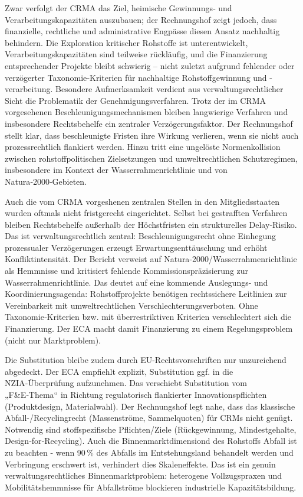 \documentclass[12pt,a4paper,oneside]{book} %
\begin{document}
Zwar verfolgt der CRMA das Ziel, heimische Gewinnungs‑ und Verarbeitungskapazitäten auszubauen; der Rechnungshof zeigt jedoch, dass finanzielle, rechtliche und administrative Engpässe diesen Ansatz nachhaltig behindern. Die Exploration kritischer Rohstoffe ist unterentwickelt, Verarbeitungskapazitäten sind teilweise rückläufig, und die Finanzierung entsprechender Projekte bleibt schwierig – nicht zuletzt aufgrund fehlender oder verzögerter Taxonomie‑Kriterien für nachhaltige Rohstoffgewinnung und -verarbeitung. Besondere Aufmerksamkeit verdient aus verwaltungsrechtlicher Sicht die Problematik der Genehmigungsverfahren. Trotz der im CRMA vorgesehenen Beschleunigungsmechanismen bleiben langwierige Verfahren und insbesondere Rechtsbehelfe ein zentraler Verzögerungsfaktor. Der Rechnungshof stellt klar, dass beschleunigte Fristen ihre Wirkung verlieren, wenn sie nicht auch prozessrechtlich flankiert werden.  Hinzu tritt eine ungelöste Normenkollision zwischen rohstoffpolitischen Zielsetzungen und umweltrechtlichen Schutzregimen, insbesondere im Kontext der Wasserrahmenrichtlinie und von Natura‑2000‑Gebieten.

 Auch die vom CRMA vorgeshenen zentralen Stellen in den Mitgliedsstaaten wurden oftmals nicht fristgerecht eingerichtet.  Selbst bei gestrafften Verfahren bleiben Rechtsbehelfe außerhalb der Höchstfristen ein strukturelles Delay‑Risiko. Das ist verwaltungsrechtlich zentral: Beschleunigungsrecht ohne Einhegung prozessualer Verzögerungen erzeugt Erwartungsenttäuschung und erhöht Konfliktintensität. Der Bericht verweist auf Natura‑2000/Wasserrahmenrichtlinie als Hemmnisse und kritisiert fehlende Kommissionspräzisierung zur Wasserrahmenrichtlinie. Das deutet auf eine kommende Auslegungs- und Koordinierungsagenda: Rohstoffprojekte benötigen rechtssichere Leitlinien zur Vereinbarkeit mit umweltrechtlichen Verschlechterungsverboten.  Ohne Taxonomie‑Kriterien bzw. mit überrestriktiven Kriterien verschlechtert sich die Finanzierung. Der ECA macht damit Finanzierung zu einem Regelungsproblem (nicht nur Marktproblem).

Die Substitution bleibe zudem durch EU-Rechtsvorschriften nur unzureichend abgedeckt.  Der ECA empfiehlt explizit, Substitution ggf. in die NZIA‑Überprüfung aufzunehmen. Das verschiebt Substitution vom „F&E‑Thema“ in Richtung regulatorisch flankierter Innovationspflichten (Produktdesign, Materialwahl). Der Rechnungshof legt nahe, dass  das klassische Abfall-/Recyclingrecht (Massenströme, Sammelquoten) für CRMs nicht genügt. Notwendig sind stoffspezifische Pflichten/Ziele (Rückgewinnung, Mindestgehalte, Design‑for‑Recycling). Auch die Binnenmarktdimensiond des Rohstoffs Abfall ist zu beachten - wenn 90 \% des Abfalls im Entstehungsland behandelt werden und Verbringung erschwert ist, verhindert dies Skaleneffekte. Das ist ein genuin verwaltungsrechtliches Binnenmarktproblem: heterogene Vollzugspraxen und Mobilitätshemmnisse für Abfallströme blockieren industrielle Kapazitätsbildung.
\end{document}
